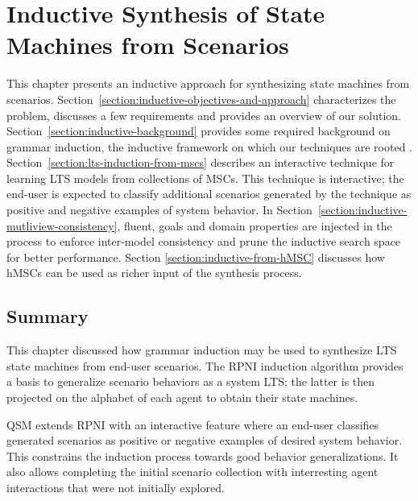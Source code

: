 \chapter{Inductive Synthesis of State Machines from Scenarios\label{chapter:inductive-synthesis}}

This chapter presents an inductive approach for synthesizing state machines from scenarios. Section~\ref{section:inductive-objectives-and-approach} characterizes the problem, discusses a few requirements and provides an overview of our solution. Section~\ref{section:inductive-background} provides some required background on grammar induction, the inductive framework on which our techniques are rooted \cite{Gold:1978}. Section~\ref{section:lts-induction-from-mscs} describes an interactive technique for learning LTS models from collections of MSCs. This technique is interactive; the end-user is expected to classify additional scenarios generated by the technique as positive and negative examples of system behavior. In Section~\ref{section:inductive-mutliview-consistency}, fluent, goals and domain properties are injected in the process to enforce inter-model consistency and prune the inductive search space for better performance. Section \ref{section:inductive-from-hMSC} discusses how hMSCs can be used as richer input of the synthesis process.








\section*{Summary}

This chapter discussed how grammar induction may be used to synthesize LTS state machines from end-user scenarios. The RPNI induction algorithm provides a basis to generalize scenario behaviors as a system LTS; the latter is then projected on the alphabet of each agent to obtain their state machines. 

QSM extends RPNI with an interactive feature where an end-user classifies generated scenarios as positive or negative examples of desired system behavior. This constrains the induction process towards good behavior generalizations. It also allows completing the initial scenario collection with interresting agent interactions that were not initially explored.

